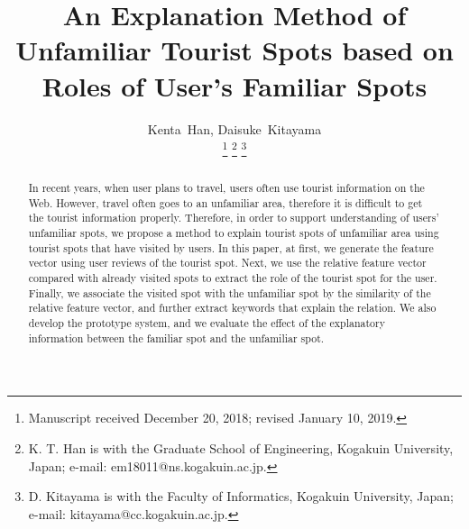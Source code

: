 \documentclass[journal]{IAENGtran}
\begin{document}
\title{An Explanation Method of Unfamiliar Tourist Spots based on Roles of User's Familiar Spots}

\author{Kenta~Han, Daisuke~Kitayama

\thanks{Manuscript received December 20, 2018; revised January 10, 2019. }
\thanks{K. T. Han is with the Graduate School of Engineering, Kogakuin University, Japan; e-mail: em18011@ns.kogakuin.ac.jp.}%
\thanks{D. Kitayama is with the Faculty of Informatics, Kogakuin University, Japan;  e-mail: kitayama@cc.kogakuin.ac.jp.}}%

\maketitle

\pagestyle{empty}
\thispagestyle{empty}

\begin{abstract}
In recent years, when user plans to travel, users often use tourist information on the Web.
However, travel often goes to an unfamiliar area, therefore it is difficult to get the tourist information properly.
Therefore, in order to support understanding of users' unfamiliar spots, we propose a method to explain tourist spots of unfamiliar area using tourist spots that have visited by users.
In this paper, at first, we generate the feature vector using user reviews of the tourist spot.
Next, we use the relative feature vector compared with already visited spots to extract the role of the tourist spot for the user.
Finally, we associate the visited spot with the unfamiliar spot by the similarity of the relative feature vector, and further extract keywords that explain the relation.
We also develop the prototype system, and we evaluate the effect of the explanatory information between the familiar spot and the unfamiliar spot.
\end{abstract}
\end{document}
